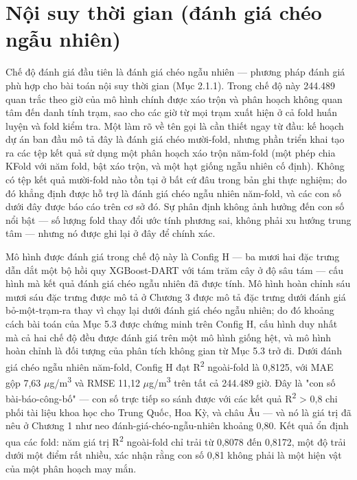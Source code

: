 \section{Nội suy thời gian (đánh giá chéo ngẫu nhiên)}

Chế độ đánh giá đầu tiên là đánh giá chéo ngẫu nhiên --- phương pháp đánh giá phù hợp cho bài toán nội suy thời gian (Mục 2.1.1). Trong chế độ này 244.489 quan trắc theo giờ của mô hình chính được xáo trộn và phân hoạch không quan tâm đến danh tính trạm, sao cho các giờ từ mọi trạm xuất hiện ở cả fold huấn luyện và fold kiểm tra. Một làm rõ về tên gọi là cần thiết ngay từ đầu: kế hoạch dự án ban đầu mô tả đây là đánh giá chéo mười-fold, nhưng phần triển khai tạo ra các tệp kết quả sử dụng một phân hoạch xáo trộn năm-fold (một phép chia KFold với năm fold, bật xáo trộn, và một hạt giống ngẫu nhiên cố định). Không có tệp kết quả mười-fold nào tồn tại ở bất cứ đâu trong bản ghi thực nghiệm; do đó khẳng định được hỗ trợ là đánh giá chéo ngẫu nhiên năm-fold, và các con số dưới đây được báo cáo trên cơ sở đó. Sự phân định không ảnh hưởng đến con số nổi bật --- số lượng fold thay đổi ước tính phương sai, không phải xu hướng trung tâm --- nhưng nó được ghi lại ở đây để chính xác.

Mô hình được đánh giá trong chế độ này là Config H --- ba mươi hai đặc trưng dẫn dắt một bộ hồi quy XGBoost-DART với tám trăm cây ở độ sâu tám --- cấu hình mà kết quả đánh giá chéo ngẫu nhiên đã được tính. Mô hình hoàn chỉnh sáu mươi sáu đặc trưng được mô tả ở Chương 3 được mô tả đặc trưng dưới đánh giá bỏ-một-trạm-ra thay vì chạy lại dưới đánh giá chéo ngẫu nhiên; do đó khoảng cách bài toán của Mục 5.3 được chứng minh trên Config H, cấu hình duy nhất mà cả hai chế độ đều được đánh giá trên một mô hình giống hệt, và mô hình hoàn chỉnh là đối tượng của phân tích không gian từ Mục 5.3 trở đi. Dưới đánh giá chéo ngẫu nhiên năm-fold, Config H đạt R\textsuperscript{2} ngoài-fold là 0,8125, với MAE gộp 7,63 $\mu$g/m\textsuperscript{3} và RMSE 11,12 $\mu$g/m\textsuperscript{3} trên tất cả 244.489 giờ. Đây là "con số bài-báo-công-bố" --- con số trực tiếp so sánh được với các kết quả R\textsuperscript{2} > 0,8 chi phối tài liệu khoa học cho Trung Quốc, Hoa Kỳ, và châu Âu --- và nó là giá trị đã nêu ở Chương 1 như neo đánh-giá-chéo-ngẫu-nhiên khoảng 0,80. Kết quả ổn định qua các fold: năm giá trị R\textsuperscript{2} ngoài-fold chỉ trải từ 0,8078 đến 0,8172, một độ trải dưới một điểm rất nhiều, xác nhận rằng con số 0,81 không phải là một hiện vật của một phân hoạch may mắn.

